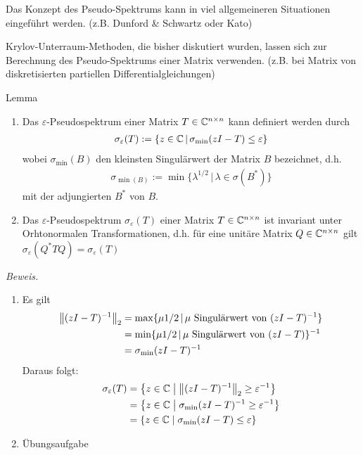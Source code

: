 \begin{rembox}
  Das Konzept des Pseudo-Spektrums kann in viel allgemeineren Situationen eingeführt werden. 
  (z.B. Dunford \& Schwartz oder Kato)
\end{rembox}

\begin{rembox}
  Krylov-Unterraum-Methoden, die bisher diskutiert wurden, lassen sich zur Berechnung des Pseudo-Spektrums einer 
  Matrix verwenden. (z.B. bei Matrix von diskretisierten partiellen Differentialgleichungen)
\end{rembox}

\begin{thmbox}{Lemma}
  \begin{enumerate}
    \item Das $\varepsilon$-Pseudospektrum einer Matrix $T\in\mathbb C  ^{n\times n}$ kann definiert werden 
      durch
      \begin{align*}\sigma_\varepsilon(T) := \{z\in\mathbb C  \,|\,\sigma_{\min}(zI-T)\leq\varepsilon\}\end{align*}
      wobei $\sigma_{\min}(B)$ den kleinsten Singulärwert der Matrix $B$ bezeichnet, d.h. 
      \begin{align*}\sigma_{\min(B)}:=\min\{\lambda^{1/2}\,|\,\lambda\in\sigma(B^*)\}\end{align*}
      mit der adjungierten $B^*$ von $B$.
    \item Das $\varepsilon$-Pseudospektrum $\sigma_\varepsilon(T)$ einer Matrix $T\in\mathbb C  ^{n\times n}$ ist 
      invariant unter Orhtonormalen Transformationen, d.h. für eine unitäre Matrix $Q\in\mathbb C  ^{n\times n}$ 
      gilt $\sigma_\varepsilon(Q^*TQ) = \sigma_\varepsilon(T)$
  \end{enumerate}
\end{thmbox}
\textit{Beweis.} 
\begin{enumerate}
  \item Es gilt
    \begin{align*}
      \vertn{2}{(zI-T)^{-1}}_2 
      &= \max\{\mu{1/2}\,|\, \mu \text{ Singulärwert von } (zI-T)^{-1}\}  \\
      &= \min\{\mu{1/2}\,|\, \mu \text{ Singulärwert von } (zI-T)\}^{-1} \\
      &= \sigma_{\min}(zI-T)^{-1}
    \end{align*}
    Daraus folgt:
    \begin{align*}
      \sigma_\varepsilon(T) 
      &= \left\{ z \in \C   \;\middle|\; \vertn{2}{(zI-T)^{-1}}_2 \geq \varepsilon^{-1} \right\} \\
      &= \left\{ z \in \C   \;\middle|\; \sigma_{\min}(zI-T)^{-1} \geq \varepsilon^{-1} \right\} \\
      &= \left\{ z \in \C   \;\middle|\; \sigma_{\min}(zI-T) \leq \varepsilon \right\}
    \end{align*}
  \item Übungsaufgabe
\end{enumerate}

